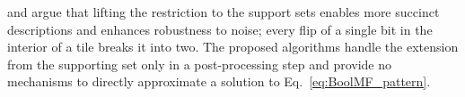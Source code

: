 \cite{kontonasios2010information} and \cite{xiang2011summarizing} argue that lifting the restriction to the support sets enables more succinct descriptions and enhances robustness to noise; every flip of a single bit in the interior of a tile breaks it into two. The proposed algorithms handle the extension from the supporting set only in a post-processing step and provide no mechanisms to directly approximate a solution to Eq.~\eqref{eq:BoolMF_pattern}.


